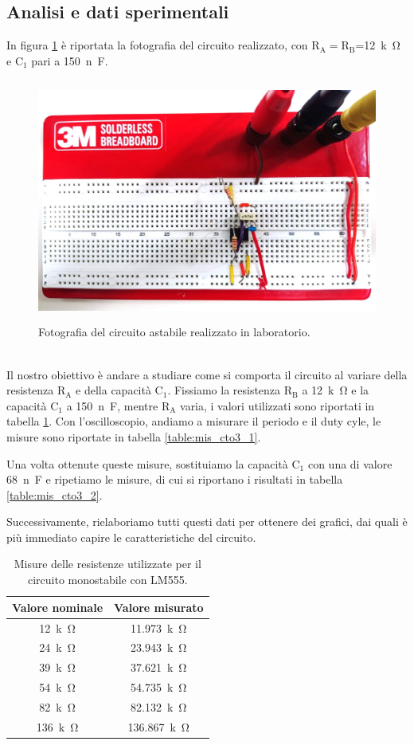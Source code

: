 \documentclass{report}
\begin{document}
\subsection{Analisi e dati sperimentali}
In figura \ref{figura:circuito3} è riportata la fotografia del circuito realizzato, con $\mathrm{R_A=R_B}$=\SI{12}{k\ohm} e $\mathrm{C_1}$ pari a \SI{150}{n\farad}.
\begin{figure}[h!]
	\centering
	\includegraphics[height=8cm]{immagini/circuito3}
	\caption{Fotografia del circuito astabile realizzato in laboratorio.}
	\label{figura:circuito3}
\end{figure}
\\Il nostro obiettivo è andare a studiare come si comporta il circuito al variare della resistenza $\mathrm{R_A}$ e della capacità $\mathrm{C_1}$. Fissiamo la resistenza $\mathrm{R_B}$ a \SI{12}{k\ohm} e la capacità $\mathrm{C_1}$ a \SI{150}{n\farad}, mentre $\mathrm{R_A}$ varia, i valori utilizzati sono riportati in tabella \ref{table:mis_res3}. Con l'oscilloscopio, andiamo a misurare il periodo e il duty cyle, le misure sono riportate in tabella \ref{table:mis_cto3_1}. \par
Una volta ottenute queste misure, sostituiamo la capacità $\mathrm{C_1}$ con una di valore \SI{68}{n\farad} e ripetiamo le misure, di cui si riportano i risultati in tabella \ref{table:mis_cto3_2}. \par
Successivamente, rielaboriamo tutti questi dati per ottenere dei grafici, dai quali è più immediato capire le caratteristiche del circuito. 
\begin{table}[h!]
	\centering
	\begin{tabular}{|c|c|}
	\hline
		\textbf{Valore nominale} & \textbf{Valore misurato}\\ 
		\hline
		\SI{12}{k\ohm} & \SI{11.973}{k\ohm} \\ 
		\hline
		 \SI{24}{k\ohm} & \SI{23.943}{k\ohm} \\ 
		\hline
		\SI{39}{k\ohm} & \SI{37.621}{k\ohm} \\ 
		\hline
		 \SI{54}{k\ohm} & \SI{54.735}{k\ohm} \\ 
		\hline
		 \SI{82}{k\ohm} & \SI{82.132}{k\ohm} \\ 
		\hline
		 \SI{136}{k\ohm} & \SI{136.867}{k\ohm} \\ 
		\hline
	\end{tabular}
	\caption{Misure delle resistenze utilizzate per il circuito monostabile con LM555.}
	\label{table:mis_res3}
\end{table}
\end{document}
